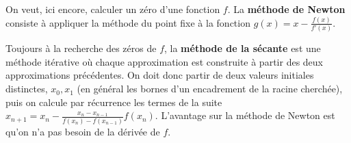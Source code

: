 \documentclass{exam}
\begin{document}
\begin{questions}
\question
On veut, ici encore, calculer un zéro d'une fonction $f$. La {\bf méthode de Newton} consiste à appliquer la méthode du point fixe à la fonction 
$g(x) = x - \frac{f(x)}{f'(x)}$.

\question
Toujours à la recherche des zéros de $f$, la {\bf méthode de la sécante} est une méthode itérative où chaque approximation est construite à partir des deux approximations précédentes. On doit donc partir de deux valeurs initiales distinctes, $x_0, x_1$ (en général les bornes d'un encadrement de la racine cherchée), puis on calcule par récurrence les termes de la suite $x_{n+1} = x_n - \frac{x_n - x_{n-1}}{f(x_n) - f(x_{n-1})}f(x_n)$. L'avantage sur la méthode de Newton est qu'on n'a pas besoin de la dérivée de $f$.
\end{questions}
\end{document}

